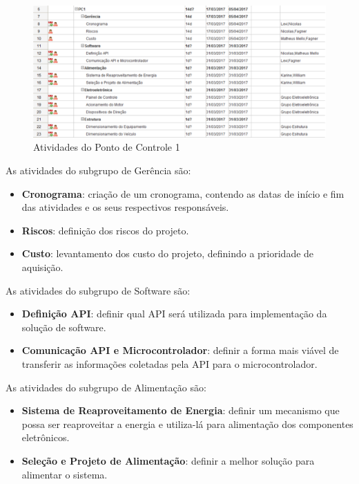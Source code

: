 \begin{apendicesenv}
		\graphicspath{{figuras/}}
			\begin{figure}[h!]
			\centering
			\includegraphics[scale=0.60]{PC1}
			\caption{Atividades do Ponto de Controle 1}
			\label{img:PC1}
			\end{figure}	
		
		As atividades do subgrupo de Gerência são:
		
		\begin{itemize}
			\item \textbf{Cronograma}: criação de um cronograma, contendo as datas de início e fim das atividades e os seus respectivos responsáveis.
			\item \textbf{Riscos}: definição dos riscos do projeto.
			\item \textbf{Custo}: levantamento dos custo do projeto, definindo a prioridade de aquisição.
		\end{itemize}	
		
		As atividades do subgrupo de Software são:
		
		\begin{itemize}
			\item \textbf{Definição API}: definir qual API será utilizada para implementação da solução de software.
			\item \textbf{Comunicação API e Microcontrolador}: definir a forma mais viável de transferir as informações coletadas pela API para o microcontrolador.
		\end{itemize}				

	As atividades do subgrupo de Alimentação são:
	
	\begin{itemize}
		\item \textbf{Sistema de Reaproveitamento de Energia}: definir um mecanismo que possa ser reaproveitar a energia e utiliza-lá para alimentação dos componentes eletrônicos.
		\item \textbf{Seleção e Projeto de Alimentação}: definir a melhor solução para alimentar o sistema. 
	\end{itemize}		
	

\end{apendicesenv}
